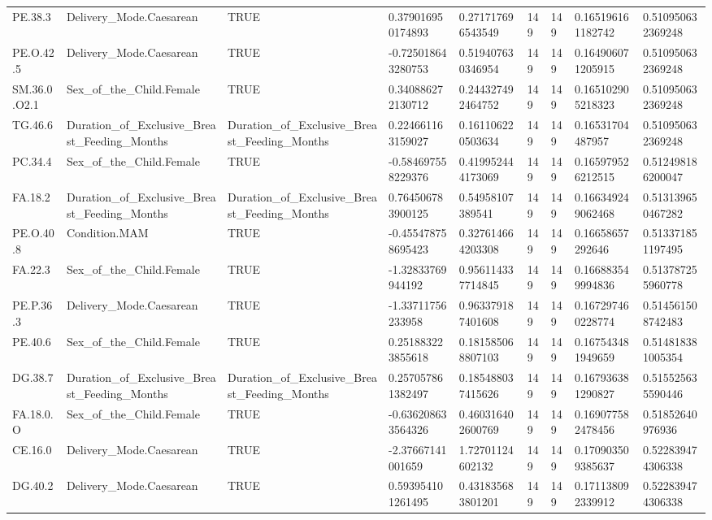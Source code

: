 \begin{longtable}{lllllllll}
PE.38.3 & Delivery\_Mode.Caesarean & TRUE & 0.379016950174893 & 0.271717696543549 & 149 & 149 & 0.165196161182742 & 0.510950632369248 \\
PE.O.42.5 & Delivery\_Mode.Caesarean & TRUE & -0.725018643280753 & 0.519407630346954 & 149 & 149 & 0.164906071205915 & 0.510950632369248 \\
SM.36.0.O2.1 & Sex\_of\_the\_Child.Female & TRUE & 0.340886272130712 & 0.244327492464752 & 149 & 149 & 0.165102905218323 & 0.510950632369248 \\
TG.46.6 & Duration\_of\_Exclusive\_Breast\_Feeding\_Months & Duration\_of\_Exclusive\_Breast\_Feeding\_Months & 0.224661163159027 & 0.161106220503634 & 149 & 149 & 0.16531704487957 & 0.510950632369248 \\
PC.34.4 & Sex\_of\_the\_Child.Female & TRUE & -0.584697558229376 & 0.419952444173069 & 149 & 149 & 0.165979526212515 & 0.512498186200047 \\
FA.18.2 & Duration\_of\_Exclusive\_Breast\_Feeding\_Months & Duration\_of\_Exclusive\_Breast\_Feeding\_Months & 0.764506783900125 & 0.54958107389541 & 149 & 149 & 0.166349249062468 & 0.513139650467282 \\
PE.O.40.8 & Condition.MAM & TRUE & -0.455478758695423 & 0.327614664203308 & 149 & 149 & 0.16658657292646 & 0.513371851197495 \\
FA.22.3 & Sex\_of\_the\_Child.Female & TRUE & -1.32833769944192 & 0.956114337714845 & 149 & 149 & 0.166883549994836 & 0.513787255960778 \\
PE.P.36.3 & Delivery\_Mode.Caesarean & TRUE & -1.33711756233958 & 0.963379187401608 & 149 & 149 & 0.167297460228774 & 0.514561508742483 \\
PE.40.6 & Sex\_of\_the\_Child.Female & TRUE & 0.251883223855618 & 0.181585068807103 & 149 & 149 & 0.167543481949659 & 0.514818381005354 \\
DG.38.7 & Duration\_of\_Exclusive\_Breast\_Feeding\_Months & Duration\_of\_Exclusive\_Breast\_Feeding\_Months & 0.257057861382497 & 0.185488037415626 & 149 & 149 & 0.167936381290827 & 0.515525635590446 \\
FA.18.0.O & Sex\_of\_the\_Child.Female & TRUE & -0.636208633564326 & 0.460316402600769 & 149 & 149 & 0.169077582478456 & 0.51852640976936 \\
CE.16.0 & Delivery\_Mode.Caesarean & TRUE & -2.37667141001659 & 1.72701124602132 & 149 & 149 & 0.170903509385637 & 0.522839474306338 \\
DG.40.2 & Delivery\_Mode.Caesarean & TRUE & 0.593954101261495 & 0.431835683801201 & 149 & 149 & 0.171138092339912 & 0.522839474306338 \\

\end{longtable}
